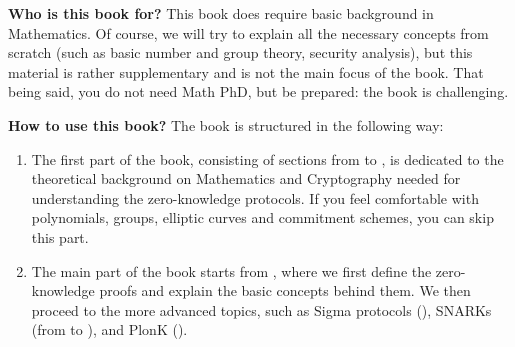 \documentclass[lecture-notes.tex]{subfiles}
\begin{document}
\textbf{Who is this book for?} This book does require basic background in
Mathematics. Of course, we will try to explain all the necessary concepts from
scratch (such as basic number and group theory, security analysis), but this
material is rather supplementary and is not the main focus of the book. That
being said, you do not need Math PhD, but be prepared: the book is challenging.

\textbf{How to use this book?} The book is structured in the following way:
\begin{enumerate}
    \item The first part of the book, consisting of sections from
     to , is dedicated to
    the theoretical background on Mathematics and Cryptography needed for
    understanding the zero-knowledge protocols. If you feel comfortable with
    polynomials, groups, elliptic curves and commitment schemes, you can skip
    this part.
    \item The main part of the book starts from , where 
    we first define the zero-knowledge proofs and explain the basic concepts
    behind them. We then proceed to the more advanced topics, such as Sigma
    protocols (), SNARKs (from 
    to ), and PlonK ().
\end{enumerate}
\end{document}
